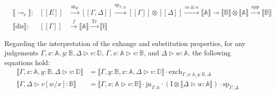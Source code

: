 \begin{align*}
      &\llbracket \multimap_e \rrbracket : & [\![E]\!] & \xrightarrow{\hspace{2pt}\text{sh}_{E}\hspace{2pt}}   [\![\Gamma,\Delta ]\!]   \xrightarrow{\hspace{1pt}\text{sp}_{\Gamma;\Delta}\hspace{1pt}}  [\![\Gamma ]\!] \otimes [\![\Delta ]\!]  \xrightarrow{\hspace{2pt} m \hspace{1pt} \otimes \hspace{1pt} n \hspace{2pt}} \llbracket \mathbb{A} \rrbracket \multimap \llbracket \mathbb{B} \rrbracket \otimes \llbracket \mathbb{A} \rrbracket  \xrightarrow{\hspace{2pt} \text{app} \hspace{2pt}} \llbracket \mathbb{B} \rrbracket \\
      &\llbracket \text{dis} \rrbracket : & [\![\Gamma]\!] & \xrightarrow{\hspace{2pt} f \hspace{2pt}} \llbracket \mathbb{A} \rrbracket \xrightarrow{\hspace{2pt} \text{Tr} \hspace{2pt}} \llbracket \mathbb{I} \rrbracket
\end{align*} 


Regarding the interpretation of the exhange and substitution properties, for any judgements $\Gamma, x: \mathbb{A}, y: \mathbb{B}, \Delta \triangleright v : \mathbb{D}$, $\Gamma, x: \mathbb{A} \triangleright v: \mathbb{B}$, and $\Delta \triangleright w: \mathbb{A}$, the following equations hold:
\begin{equation}
\begin{split}
  \llbracket \Gamma, x: \mathbb{A}, y: \mathbb{B}, \Delta \triangleright v : \mathbb{D} \rrbracket & = \llbracket \Gamma,  y: \mathbb{B}, x: \mathbb{A}, \Delta \triangleright v : \mathbb{D} \rrbracket \cdot \text{exch}_{\Gamma, \underline{x: \mathbb{A}, y: \mathbb{B}}, \Delta}\\
  \llbracket \Gamma,\Delta \triangleright v[w/x]: \mathbb{B} \rrbracket & = \llbracket \Gamma, x: \mathbb{A} \triangleright v: \mathbb{B} \rrbracket \cdot \text{jn}_{\Gamma;\mathbb{A}} \cdot (\text{I} \otimes \llbracket \Delta \triangleright w: \mathbb{A} \rrbracket ) \cdot \text{sp}_{\Gamma; \Delta} 
\end{split}
\end{equation}


